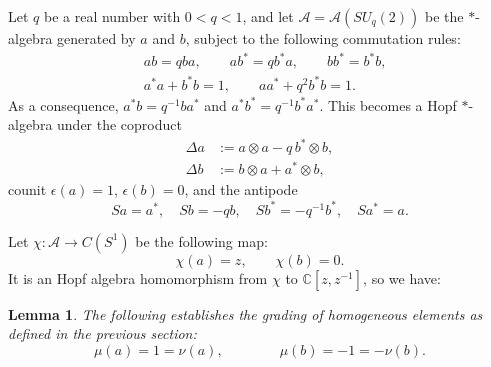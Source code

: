 \documentclass[12pt]{amsart}
\newtheorem{lem}[thm]{Lemma}
\theoremstyle{definition}
\numberwithin{equation}{section}
\newcommand{\A}{\mathcal{A}}        %
\renewcommand{\a}{\chi}             %
\newcommand{\C}{\mathbb{C}}         %
\newcommand{\cop}{\Delta}           %
\newcommand{\ox}{\otimes}           %
\begin{document}
Let $q$ be a real number with $0 < q < 1$, and let $\A = \A(SU_q(2))$ be the $*$-algebra 
generated by $a$ and $b$, subject to the following commutation rules:
\begin{align}
& a b = q b a,  \qquad  a b^*= q b^* a, \qquad bb^* = b^*b,  \\
& a^*a +  b^*b = 1,  \qquad  aa^* + q^2 b^*b = 1.
\label{eq:suq2-relns}
\end{align}
As a consequence, $a^*b = q^{-1} ba^*$ and $a^*b^* = q^{-1} b^* a^*$. 
This becomes a Hopf $*$-algebra under the coproduct
\begin{align*}
\cop a &:= a \ox a - q\,b^* \ox b,
\\
\cop b &:= b \ox a + a^* \ox b, 
\end{align*}
counit $\epsilon(a) = 1$, $\epsilon(b) = 0$, and the antipode 
$$ Sa = a^*,\quad Sb = - qb, \quad Sb^* = - q^{-1}b^*, \quad Sa^* = a.$$

Let $\a: \A \to C(S^1)$ be the following map:
$$ \a(a) = z, \quad \quad \a(b) = 0. $$
It is an Hopf algebra homomorphism from $\a$ to $\C[z,z^{-1}]$, so we have:

\begin{lem}
The following establishes the grading of homogeneous elements as defined in the previous
section:
$$ \mu(a) = 1 = \nu(a), \qquad \qquad \mu(b) = -1 = -\nu(b). $$ 
\end{lem}
\end{document}
